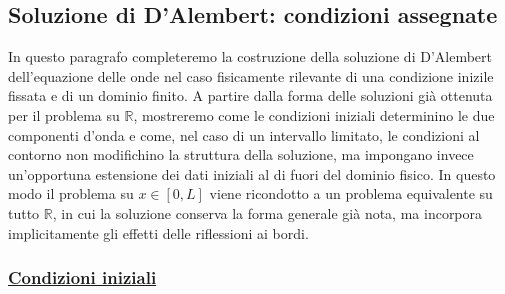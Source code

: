 \documentclass[a4paper,12pt]{report}
\begin{document}
\newpage

\subsection{Soluzione di D'Alembert: condizioni assegnate}

In questo paragrafo completeremo la costruzione della soluzione di D'Alembert dell’equazione delle onde nel caso fisicamente rilevante di una condizione inizile fissata e di un dominio finito. A partire dalla forma delle soluzioni già ottenuta per il problema su $\mathbb{R}$, mostreremo come le condizioni iniziali determinino le due componenti d’onda e come, nel caso di un intervallo limitato, le condizioni al contorno non modifichino la struttura della soluzione, ma impongano invece un’opportuna estensione dei dati iniziali al di fuori del dominio fisico. In questo modo il problema su $x\in [0,L]$ viene ricondotto a un problema equivalente su tutto $\mathbb{R}$, in cui la soluzione conserva la forma generale già nota, ma incorpora implicitamente gli effetti delle riflessioni ai bordi.

\subsubsection{\underline{Condizioni iniziali}}
\end{document}
